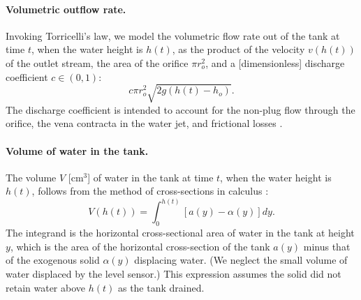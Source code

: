 \documentclass[a4paper,fleqn]{cas-dc}
\begin{document}
\paragraph{Volumetric outflow rate.}
Invoking Torricelli's law, we model the volumetric flow rate out of the tank at time $t$, when the water height is $h(t)$, as the product of the velocity $v(h(t))$ of the outlet stream, the area of the orifice $\pi r_o^2$, and a [dimensionless] discharge coefficient $c\in(0, 1)$:
\begin{equation}
	c \pi r_o^2 \sqrt{2 g(h(t)-h_o)}. \label{eq:outletflow}
\end{equation}
The discharge coefficient is intended to account for the non-plug flow through the orifice, the vena contracta in the water jet, and frictional losses
\cite{horsch2020simple,teoman2022discharge,hicks2014determining,blasone2015discharge,lienhard1984velocity,wadhwa2021study}. 

\paragraph{Volume of water in the tank.}
The volume $V$ [cm$^3$] of water in the tank at time $t$, when the water height is $h(t)$, follows from the method of cross-sections in calculus \cite{debook}:
\begin{equation}
	V(h(t))=\int_0^{h(t)} \left[a(y) - \alpha(y) \right] dy. \label{eq:volume}
\end{equation}
The integrand is the horizontal cross-sectional area of water in the tank at height $y$, which is the area of the horizontal cross-section of the tank $a(y)$ minus that of the exogenous solid $\alpha(y)$ displacing water. (We neglect the small volume of water displaced by the level sensor.) 
This expression assumes the solid did not retain water above $h(t)$ as the tank drained. 


\end{document}
